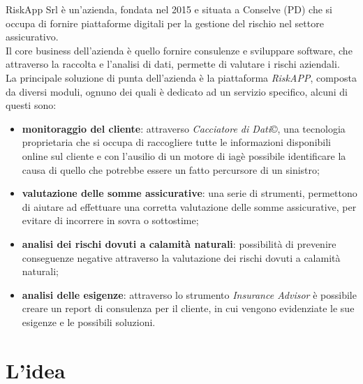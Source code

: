RiskApp Srl è un'azienda, fondata nel 2015 e situata a Conselve (PD) che si occupa di fornire piattaforme digitali per la gestione del rischio nel settore assicurativo.\\
\indent Il core business dell'azienda è quello fornire consulenze e sviluppare software, che attraverso la raccolta e l'analisi di dati, permette di valutare i rischi aziendali. \\
\indent La principale soluzione di punta dell'azienda è la piattaforma \emph{RiskAPP}, composta da diversi moduli, ognuno dei quali è dedicato ad un servizio specifico, alcuni di questi sono:
\begin{itemize}
    \item \textbf{monitoraggio del cliente}\cite{site:riskapp}: attraverso \emph{Cacciatore di Dati}\copyright, una tecnologia proprietaria che si occupa di raccogliere tutte le informazioni disponibili online sul cliente e con l'ausilio di un motore di \gls{iag}\glsoccur è possibile identificare la causa di quello che potrebbe essere un fatto percursore di un sinistro;
    \item \textbf{valutazione delle somme assicurative}\cite{site:riskapp}: una serie di strumenti, permettono di aiutare ad effettuare una corretta valutazione delle somme assicurative, per evitare di incorrere in sovra o sottostime;
    \item \textbf{analisi dei rischi dovuti a calamità naturali}\cite{site:riskapp}: possibilità di prevenire conseguenze negative attraverso la valutazione dei rischi dovuti a calamità naturali;
    \item \textbf{analisi delle esigenze}\cite{site:riskapp}: attraverso lo strumento \emph{Insurance Advisor} è possibile creare un report di consulenza per il cliente, in cui vengono evidenziate le sue esigenze e le possibili soluzioni.
\end{itemize}

\section{L'idea}
\label{sec:idea}

